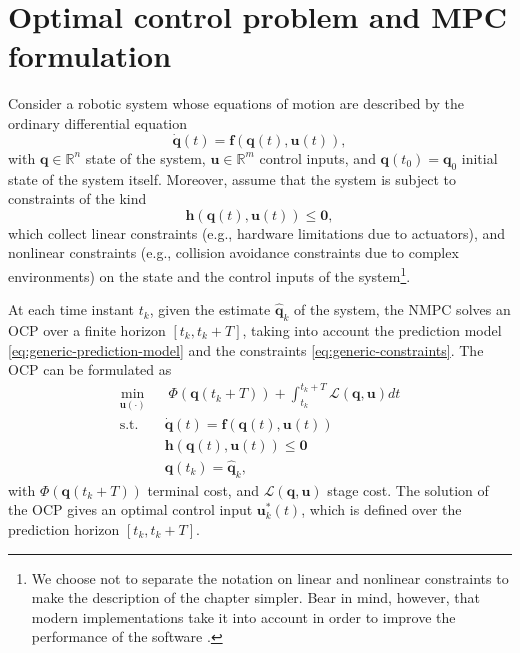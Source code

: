 \section{Optimal control problem and MPC formulation}
Consider a robotic system whose equations of motion are described by the 
ordinary differential equation
\begin{equation}
    \label{eq:generic-prediction-model}
    \dot{\bm{q}}(t) = \bm{f}(\bm{q}(t), \bm{u}(t)),
\end{equation}
with $\bm{q}\in\mathbb{R}^n$ state of the system, $\bm{u}\in\mathbb{R}^m$
control inputs, and $\bm{q}(t_0)=\bm{q}_0$ initial state of the system itself.
Moreover, assume that the system is subject to constraints of the 
kind
\begin{equation}
    \label{eq:generic-constraints}
    \bm{h}(\bm{q}(t), \bm{u}(t)) \le \bm{0},
\end{equation}
which collect linear constraints (e.g., hardware limitations due to actuators),
and nonlinear constraints (e.g., collision avoidance constraints due to 
complex environments) on the state and the control inputs of the system\footnote{
We choose not to separate the notation on linear and nonlinear constraints to 
make the description of the chapter simpler. Bear in mind, however, that 
modern implementations take it into account in order to improve the
performance of the software \cite{Verschueren2021acados}.
}.

At each time instant $t_k$, given the estimate $\hat{\bm{q}}_k$ of the system,
the NMPC solves an OCP over a finite horizon $[t_k, t_k + T]$, taking into account the 
prediction model \eqref{eq:generic-prediction-model} and the constraints 
\eqref{eq:generic-constraints}. The OCP can be formulated as
\begin{equation}
    \label{eq:OCP}
    \begin{aligned}
        \min_{\bm{u}(\cdot)} \;\;
            & \; \Phi(\bm{q}(t_k + T)) + \int_{t_k}^{t_k + T} \mathcal{L}(\bm{q}, \bm{u}) dt \\
            \text{s.t. } & \dot{\bm{q}}(t) = \bm{f}(\bm{q}(t), \bm{u}(t)) \\
                         & \bm{h}(\bm{q}(t), \bm{u}(t)) \le \bm{0} \\
                         & \bm{q}(t_k) = \hat{\bm{q}}_k,
    \end{aligned}
\end{equation}
with $\Phi(\bm{q}(t_k + T))$ terminal cost, and $\mathcal{L}(\bm{q}, \bm{u})$
stage cost. The solution of the OCP gives an optimal control input $\bm{u}_k^*(t)$,
which is defined over the prediction horizon $[t_k, t_k + T]$.

